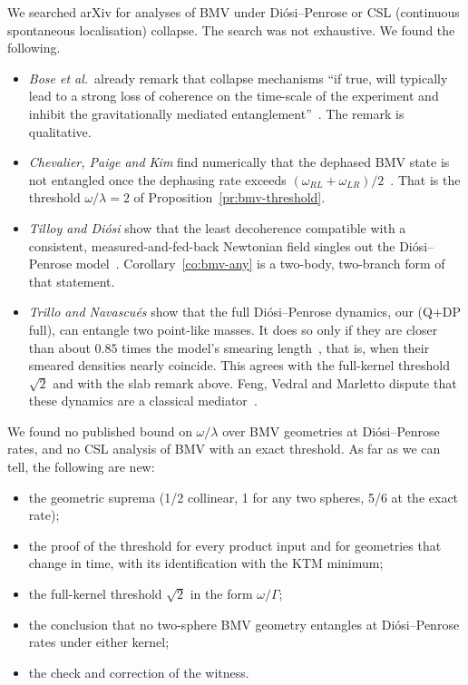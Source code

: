 We searched arXiv for analyses of BMV under Di\'osi--Penrose or CSL (continuous spontaneous localisation) collapse. The search was not
exhaustive. We found the following.
\begin{itemize}[nosep]
\item \emph{Bose et al.}\ already remark that collapse mechanisms ``if true, will typically lead to a strong loss of coherence on the
time-scale of the experiment and inhibit the gravitationally mediated entanglement''~\cite{bose}. The remark is qualitative.
\item \emph{Chevalier, Paige and Kim} find numerically that the dephased BMV state is not entangled once the dephasing rate exceeds
$(\omega_{RL}+\omega_{LR})/2$~\cite{chevalier2020}. That is the threshold $\omega/\lambda=2$ of Proposition~\ref{pr:bmv-threshold}.
\item \emph{Tilloy and Di\'osi} show that the least decoherence compatible with a consistent, measured-and-fed-back Newtonian field singles
out the Di\'osi--Penrose model~\cite{tilloydiosi2017}. Corollary~\ref{co:bmv-any} is a two-body, two-branch form of that statement.
\item \emph{Trillo and Navascu\'es} show that the full Di\'osi--Penrose dynamics, our (Q+DP full), can entangle two point-like masses. It
does so only if they are closer than about $0.85$ times the model's smearing length~\cite{trillo2025}, that is, when their smeared densities
nearly coincide. This agrees with the full-kernel threshold $\sqrt2$ and with the slab remark above. Feng, Vedral and Marletto dispute that
these dynamics are a classical mediator~\cite{feng2025}.
\end{itemize}
We found no published bound on $\omega/\lambda$ over BMV geometries at Di\'osi--Penrose rates, and no CSL analysis of BMV with an exact
threshold. As far as we can tell, the following are new:
\begin{itemize}[nosep]
\item the geometric suprema (1/2 collinear, 1 for any two spheres, 5/6 at the exact rate);
\item the proof of the threshold for every product input and for geometries that change in time, with its identification with the KTM
minimum;
\item the full-kernel threshold $\sqrt2$ in the form $\omega/\Gamma$;
\item the conclusion that no two-sphere BMV geometry entangles at Di\'osi--Penrose rates under either kernel;
\item the check and correction of the witness.
\end{itemize}

